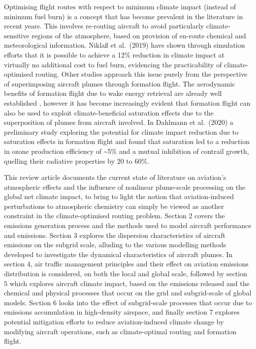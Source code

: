 Optimising flight routes with respect to minimum climate impact (instead of minimum fuel burn) is a concept that has become prevalent in the literature in recent years. This involves re-routing aircraft to avoid particularly climate-sensitive regions of the atmosphere, based on provision of en-route chemical and meteorological information. Nikla{\ss} et al.\ (2019) \cite{Niklass2019} have shown through simulation efforts that it is possible to achieve a 12\% reduction in climate impact at virtually no additional cost to fuel burn, evidencing the practicability of climate-optimised routing. Other studies approach this issue purely from the perspective of superimposing aircraft plumes through formation flight. The aerodynamic benefits of formation flight due to wake energy retrieval are already well established \cite{Bangash2004, Kent2020}, however it has become increasingly evident that formation flight can also be used to exploit climate-beneficial saturation effects due to the superposition of plumes from aircraft involved. In Dahlmann et al.\ (2020) \cite{Dahlmann2020} a preliminary study exploring the potential for climate impact reduction due to saturation effects in formation flight and found that  saturation led to a reduction in ozone production efficiency of \textasciitilde5\% and a mutual inhibition of contrail growth, quelling their radiative properties by 20 to 60\%. 

This review article documents the current state of literature on aviation's atmospheric effects and the influence of nonlinear plume-scale processing on the global net climate impact, to bring to light the notion that aviation-induced perturbations to atmospheric chemistry can simply be viewed as another constraint in the climate-optimised routing problem. Section 2 covers the emissions generation process and the methods used to model aircraft performance and emissions. Section 3 explores the dispersion characteristics of aircraft emissions on the subgrid scale, alluding to the various modelling methods developed to investigate the dynamical characteristics of aircraft plumes. In section 4, air traffic management principles and their effect on aviation emissions distribution is considered, on both the local and global scale, followed by section 5 which explores aircraft climate impact, based on the emissions released and the chemical and physical processes that occur on the grid and subgrid-scale of global models. Section 6 looks into the effect of subgrid-scale processes that occur due to emissions accumulation in high-density airspace, and finally section 7 explores potential mitigation efforts to reduce aviation-induced climate change by modifying aircraft operations, such as climate-optimal routing and formation flight.


